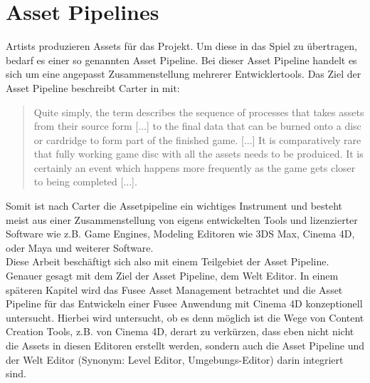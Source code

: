 \documentclass[pagesize, paper=a4, fontsize=12pt, titlepage=true, headings=small, headnosepline, abstractoff, liststotoc, nochapterprefix, plainheadsepline, twoside]{scrreprt}
\begin{document}
\section{Asset Pipelines}
Artists produzieren Assets für das Projekt. Um diese in das Spiel zu übertragen, bedarf es einer so genannten Asset Pipeline. Bei dieser Asset Pipeline handelt es sich um eine angepasst Zusammenstellung mehrerer Entwicklertools. Das Ziel der Asset Pipeline beschreibt Carter in  mit:
\begin{quote}
\glqq Quite simply, the term describes the sequence of processes that takes assets from their source form [...] to the final data that can be burned onto a disc or cardridge to form part of the finished game.
[...]
It is comparatively rare that fully working game disc with all the assets needs to be produiced. It is certainly an event which happens more frequently as the game gets closer to being completed [...].\grqq{} 
\end{quote}
Somit ist nach Carter die Assetpipeline ein wichtiges Instrument und besteht meist aus einer Zusammenstellung von eigens entwickelten Tools und lizenzierter Software wie z.B. Game Engines, Modeling Editoren wie 3DS Max, Cinema 4D, oder Maya und weiterer Software.\\
Diese Arbeit beschäftigt sich also mit einem Teilgebiet der Asset Pipeline. Genauer gesagt mit dem Ziel der Asset Pipeline, dem Welt Editor. In einem späteren Kapitel wird das Fusee Asset Management betrachtet und die Asset Pipeline für das Entwickeln einer Fusee Anwendung mit Cinema 4D konzeptionell untersucht. Hierbei wird untersucht, ob es denn möglich ist die Wege von Content Creation Tools, z.B. von Cinema 4D, derart zu verkürzen, dass eben nicht nicht die Assets in diesen Editoren erstellt werden, sondern auch die Asset Pipeline und der Welt Editor (Synonym: Level Editor, Umgebungs-Editor) darin integriert sind.
\end{document}
